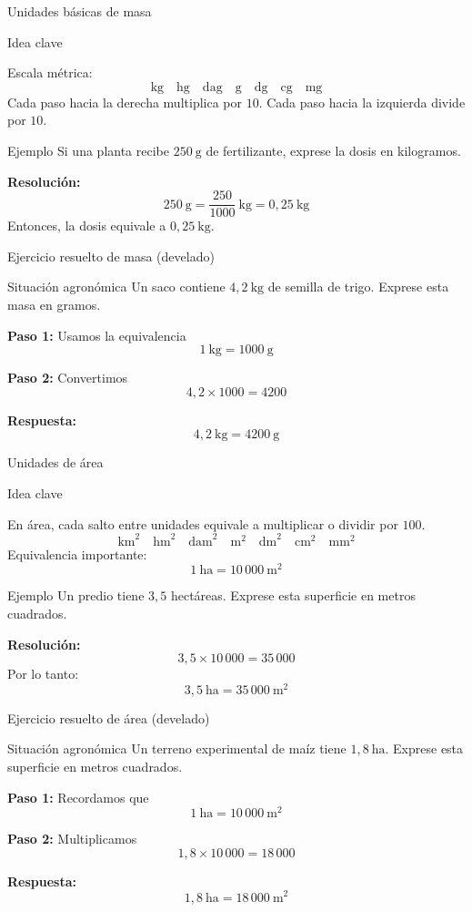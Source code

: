 \documentclass[aspectratio=169,10pt]{beamer}
\newcommand{\idea}[1]{
	\begin{block}{Idea clave}
		#1
	\end{block}
}
\newcommand{\ejemplo}[2]{
	\begin{exampleblock}{Ejemplo}
		#1
		
		\vspace{0.5em}
		\textbf{Resolución:} #2
	\end{exampleblock}
}
\begin{document}
	\begin{frame}{Unidades básicas de masa}
		\idea{
			Escala métrica:
			\[
			\text{kg}\quad \text{hg}\quad \text{dag}\quad \text{g}\quad \text{dg}\quad \text{cg}\quad \text{mg}
			\]
			Cada paso hacia la derecha multiplica por \(10\).  
			Cada paso hacia la izquierda divide por \(10\).
		}
		
		\pause
		\ejemplo
		{Si una planta recibe \(250\ \text{g}\) de fertilizante, exprese la dosis en kilogramos.}
		{
			\[
			250\ \text{g} = \frac{250}{1000}\ \text{kg} = 0{,}25\ \text{kg}
			\]
			Entonces, la dosis equivale a \(\boxed{0{,}25\ \text{kg}}\).
		}
	\end{frame}
	
	\begin{frame}{Ejercicio resuelto de masa (develado)}
		\begin{block}{Situación agronómica}
			Un saco contiene \(4{,}2\ \text{kg}\) de semilla de trigo.  
			Exprese esta masa en gramos.
		\end{block}
		
		\pause
		\textbf{Paso 1:} Usamos la equivalencia
		\[
		1\ \text{kg} = 1000\ \text{g}
		\]
		
		\pause
		\textbf{Paso 2:} Convertimos
		\[
		4{,}2 \times 1000 = 4200
		\]
		
		\pause
		\textbf{Respuesta:}
		\[
		4{,}2\ \text{kg} = \boxed{4200\ \text{g}}
		\]
	\end{frame}
	
	\begin{frame}{Unidades de área}
		\idea{
			En área, cada salto entre unidades equivale a multiplicar o dividir por \(100\).
			\[
			\text{km}^2 \quad \text{hm}^2 \quad \text{dam}^2 \quad \text{m}^2 \quad \text{dm}^2 \quad \text{cm}^2 \quad \text{mm}^2
			\]
			Equivalencia importante:
			\[
			1\ \text{ha} = 10\,000\ \text{m}^2
			\]
		}
		
		\pause
		\ejemplo
		{Un predio tiene \(3{,}5\) hectáreas. Exprese esta superficie en metros cuadrados.}
		{
			\[
			3{,}5 \times 10\,000 = 35\,000
			\]
			Por lo tanto:
			\[
			3{,}5\ \text{ha} = \boxed{35\,000\ \text{m}^2}
			\]
		}
	\end{frame}
	
	\begin{frame}{Ejercicio resuelto de área (develado)}
		\begin{block}{Situación agronómica}
			Un terreno experimental de maíz tiene \(1{,}8\ \text{ha}\).  
			Exprese esta superficie en metros cuadrados.
		\end{block}
		
		\pause
		\textbf{Paso 1:} Recordamos que
		\[
		1\ \text{ha} = 10\,000\ \text{m}^2
		\]
		
		\pause
		\textbf{Paso 2:} Multiplicamos
		\[
		1{,}8 \times 10\,000 = 18\,000
		\]
		
		\pause
		\textbf{Respuesta:}
		\[
		1{,}8\ \text{ha} = \boxed{18\,000\ \text{m}^2}
		\]
	\end{frame}
	
\end{document}
